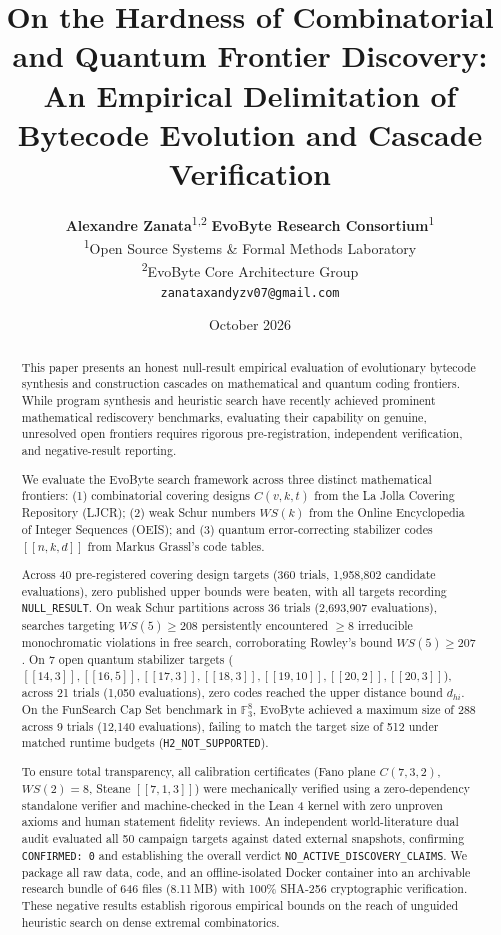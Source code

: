 \documentclass[11pt,a4paper]{article}
\title{\textbf{On the Hardness of Combinatorial and Quantum Frontier Discovery:\\An Empirical Delimitation of Bytecode Evolution and Cascade Verification}}
\author{
  \textbf{Alexandre Zanata}\textsuperscript{1,2} \quad \textbf{EvoByte Research Consortium}\textsuperscript{1} \\
  \textsuperscript{1}Open Source Systems \& Formal Methods Laboratory \\
  \textsuperscript{2}EvoByte Core Architecture Group \\
  \texttt{zanataxandyzv07@gmail.com}
}
\date{October 2026}
\begin{document}
\maketitle

\begin{abstract}
This paper presents an honest null-result empirical evaluation of evolutionary bytecode synthesis and construction cascades on mathematical and quantum coding frontiers. While program synthesis and heuristic search have recently achieved prominent mathematical rediscovery benchmarks, evaluating their capability on genuine, unresolved open frontiers requires rigorous pre-registration, independent verification, and negative-result reporting.

We evaluate the EvoByte search framework across three distinct mathematical frontiers: (1) combinatorial covering designs $C(v, k, t)$ from the La Jolla Covering Repository (LJCR); (2) weak Schur numbers $WS(k)$ from the Online Encyclopedia of Integer Sequences (OEIS); and (3) quantum error-correcting stabilizer codes $[[n, k, d]]$ from Markus Grassl's code tables.

Across 40 pre-registered covering design targets (360 trials, 1,958,802 candidate evaluations), zero published upper bounds were beaten, with all targets recording \texttt{NULL\_RESULT}. On weak Schur partitions across 36 trials (2,693,907 evaluations), searches targeting $WS(5) \ge 208$ persistently encountered $\ge 8$ irreducible monochromatic violations in free search, corroborating Rowley's bound $WS(5) \ge 207$. On 7 open quantum stabilizer targets ($[[14,3]], [[16,5]], [[17,3]], [[18,3]], [[19,10]], [[20,2]], [[20,3]]$), across 21 trials (1,050 evaluations), zero codes reached the upper distance bound $d_{hi}$. On the FunSearch Cap Set benchmark in $\mathbb{F}_3^8$, EvoByte achieved a maximum size of 288 across 9 trials (12,140 evaluations), failing to match the target size of 512 under matched runtime budgets (\texttt{H2\_NOT\_SUPPORTED}).


To ensure total transparency, all calibration certificates (Fano plane $C(7,3,2)$, $WS(2)=8$, Steane $[[7,1,3]]$) were mechanically verified using a zero-dependency standalone verifier and machine-checked in the Lean 4 kernel with zero unproven axioms and human statement fidelity reviews. An independent world-literature dual audit evaluated all 50 campaign targets against dated external snapshots, confirming \texttt{CONFIRMED: 0} and establishing the overall verdict \texttt{NO\_ACTIVE\_DISCOVERY\_CLAIMS}. We package all raw data, code, and an offline-isolated Docker container into an archivable research bundle of 646 files (8.11\,MB) with 100\% SHA-256 cryptographic verification. These negative results establish rigorous empirical bounds on the reach of unguided heuristic search on dense extremal combinatorics.
\end{abstract}
\end{document}
